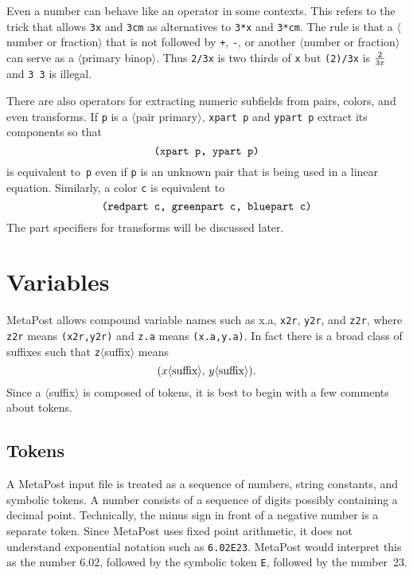 \documentclass{article} %
\newcommand\descr[1]{{\langle\hbox{#1}\rangle}}
\newcommand\invisgap{\nobreak\hskip0pt\relax}
\newcommand\tdescr[1]{$\langle$\invisgap#1\invisgap$\rangle$}
\begin{document}
Even a number can behave like an operator in some contexts.  This refers
to the trick that allows {\tt 3x} and
{\tt 3cm} as alternatives to {\tt 3*x} and {\tt 3*cm}.  The rule is that
a \tdescr{number or fraction} that is not followed by {\tt +}, {\tt -},
or another \tdescr{number or fraction} can serve as a \tdescr{primary
binop}.  Thus {\tt 2/3x} is two thirds of
{\tt x} but {\tt (2)/3x} is $2\over3x$ and {\tt 3 3} is illegal.

There are also operators for extracting numeric subfields from pairs, colors,
and even transforms.  If {\tt p} is a \tdescr{pair primary},
{\tt xpart p}\label{Dxprt} and
{\tt ypart p}\label{Dyprt} extract its
components so that
$$ \hbox{\tt (xpart p, ypart p)} $$
is equivalent to~{\tt p} even if {\tt p} is an unknown pair that is
being used in a linear equation.  Similarly, a color {\tt c} is
equivalent
to\label{Drgbprt}
$$ \hbox{\tt (redpart c, greenpart c, bluepart c)} $$
The part specifiers for transforms will be discussed later.


\section{Variables}
\label{vars}

MetaPost allows compound variable names such as {x.a}, {\tt x2r}, {\tt y2r},
and {\tt z2r}, where {\tt z2r} means {\tt (x2r,y2r)} and {\tt z.a} means
{\tt (x.a,y.a)}.  In fact there is a broad class of suffixes such that
{\tt z}\tdescr{suffix}\index{suffix?\tdescr{suffix}} means
$$ (x\descr{suffix},\, y\descr{suffix}). $$
Since a \tdescr{suffix} is composed of tokens, it is best to begin with a few
comments about tokens.

\subsection{Tokens}

A MetaPost input file is treated as a sequence of numbers, string
constants, and symbolic tokens.  A
number consists of a sequence of digits possibly containing a decimal
point.  Technically, the minus sign in front of a negative number is a
separate token.  Since MetaPost uses fixed point
arithmetic, it does not understand exponential
notation such as {\tt 6.02E23}.  MetaPost would interpret this as the
number 6.02, followed by the symbolic token {\tt E}, followed by the
number~23.
\end{document}
